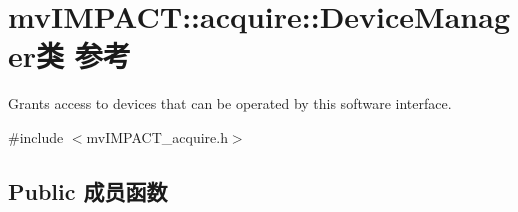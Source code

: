 \hypertarget{classmv_i_m_p_a_c_t_1_1acquire_1_1_device_manager}{\section{mv\+I\+M\+P\+A\+C\+T\+:\+:acquire\+:\+:Device\+Manager类 参考}
\label{classmv_i_m_p_a_c_t_1_1acquire_1_1_device_manager}
}


Grants access to devices that can be operated by this software interface.  




{\ttfamily \#include $<$mv\+I\+M\+P\+A\+C\+T\+\_\+acquire.\+h$>$}

\subsection*{Public 成员函数}
